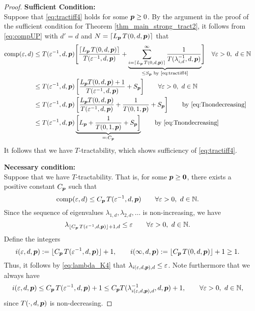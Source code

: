 \documentclass[11pt,a4paper]{article}
\begin{document}
\begin{proof}
    \textbf{Sufficient Condition:}\\
Suppose that \eqref{eq:tractiff4} holds for some $\boldsymbol{p} \ge 0$. 
By the argument in the proof of the sufficient condition for Theorem \ref{thm_main_strong_tract2}, it follows from \eqref{eq:compUP} with $d'=d$ and $N = \lceil L_{\boldsymbol{p}}\, T(0,d,\boldsymbol{p})\rceil$ that 
\begin{align*}
       \operatorname{comp}(\varepsilon,d)
       & \le T(\varepsilon^{-1},d,\boldsymbol{p}) \Biggl [ 
       \frac{\lceil L_{\boldsymbol{p}}\, T(0,d,\boldsymbol{p})\rceil}{T(\varepsilon^{-1},d,\boldsymbol{p})}  + 
       \underbrace{\sum_{i=\lceil L_{\boldsymbol{p}}\, T(0,d,\boldsymbol{p})\rceil}^\infty \frac{1}{T(\lambda_{i, d}^{-1},d,\boldsymbol{p})}}_{\le S_{\boldsymbol{p}} \text{ by \eqref{eq:tractiff4}}}
       \Biggr ] 
        \quad \forall \varepsilon > 0, \ d  \in \mathbb{N}\\
       & \le T(\varepsilon^{-1},d,\boldsymbol{p})\left[\frac{L_{\boldsymbol{p}} T(0,d,\boldsymbol{p})+1}{T(\varepsilon^{-1},d, \boldsymbol{p})} +  S_{\boldsymbol{p}} \right]
        \qquad \forall \varepsilon > 0, \ d  \in \mathbb{N}\\
       & \le T(\varepsilon^{-1},d,\boldsymbol{p})\left[\frac{L_{\boldsymbol{p}} T(0,d,\boldsymbol{p})}{T(\varepsilon^{-1},d, \boldsymbol{p})}
       + \frac{1}{T(0,1, \boldsymbol{p})} + S_{\boldsymbol{p}}\right]
       \qquad \text{by \eqref{eq:Tnondecreasing}}   \\
       & \le T(\varepsilon^{-1},d,\boldsymbol{p}) 
       \underbrace{\left [  L_{\boldsymbol{p}} + \frac{1}{T(0,1, \boldsymbol{p})} + S_{\boldsymbol{p}} \right]}_{=:C_{\boldsymbol{p}}}
       \qquad \text{by \eqref{eq:Tnondecreasing}}  
\end{align*}
It follows that we have $T$-tractability, which shows sufficiency of \eqref{eq:tractiff4}.

\bigskip

\noindent \textbf{Necessary condition:}\\
Suppose that we have
$T$-tractability. That is, for some $\boldsymbol{p} \ge \boldsymbol{0}$, there exists a positive constant $C_{\boldsymbol{p}}$ such that
\[
\operatorname{comp}(\varepsilon,d)\le C_{\boldsymbol{p}}\, T(\varepsilon^{-1},d,\boldsymbol{p}) \qquad \forall \varepsilon > 0,  \ d \in \mathbb{N}.
\]
Since the sequence of eigenvalues $\lambda_{1,d}, \lambda_{2,d}, \ldots $ is non-increasing, we have
\begin{equation}\label{eq:lambda_K4}
	\lambda_{\lfloor C_{\boldsymbol{p}}\, T(\varepsilon^{-1},d,\boldsymbol{p})\rfloor +1,d}\le \varepsilon \qquad \forall \varepsilon > 0,  \ d \in \mathbb{N}.
\end{equation}
Define the integers
\[
i (\varepsilon,d,\boldsymbol{p}):= \lfloor C_{\boldsymbol{p}}\, T(\varepsilon^{-1},d,\boldsymbol{p})\rfloor +1, \qquad
i (\infty,d,\boldsymbol{p}) := \lfloor C_{\boldsymbol{p}}\, T(0,d,\boldsymbol{p})\rfloor +1 \ge 1.
\]
Thus, it follows by \eqref{eq:lambda_K4} that $\lambda_{i(\varepsilon,d,\boldsymbol{p}),d} \le \varepsilon$.
Note furthermore that we always have
\[
i(\varepsilon,d,\boldsymbol{p})\le C_{\boldsymbol{p}}\, T(\varepsilon^{-1},d,\boldsymbol{p})+1 \le C_{\boldsymbol{p}} T(\lambda_{i(\varepsilon,d,\boldsymbol{p}),d}^{-1},d,\boldsymbol{p})+1, \qquad \forall \varepsilon > 0, \ d \in \mathbb{N},
\]
since
$T(\cdot,d,\boldsymbol{p})$ is non-decreasing.


\end{proof}
\end{document}
